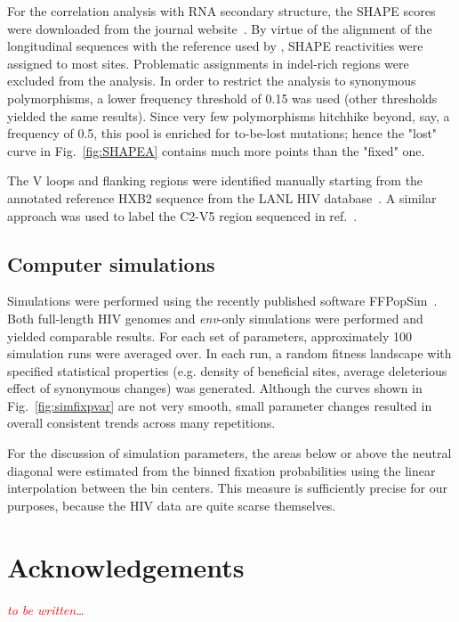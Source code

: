 \documentclass[rmp, twocolumn]{revtex4}
\newcommand{\env}{\textit{env}}
\newcommand{\comment}[1]{\textit{\textcolor{red}{#1}}}
\newcommand{\FIG}[1]{Fig.~\ref{fig:#1}}
\begin{document}
For the correlation analysis with RNA secondary structure, the SHAPE scores were
downloaded from the journal website~\citep{watts_architecture_2009}. By virtue
of the alignment of the longitudinal sequences with the reference used by
\citet{watts_architecture_2009}, SHAPE reactivities were assigned to most sites.
Problematic assignments in indel-rich regions were excluded from the analysis.
In order to restrict the analysis to synonymous polymorphisms, a lower frequency
threshold of 0.15 was used (other thresholds yielded the same results). Since
very few polymorphisms hitchhike beyond, say, a frequency of 0.5, this pool is
enriched for to-be-lost mutations; hence the "lost" curve in \FIG{SHAPEA}
contains much more points than the "fixed" one.

The V loops and flanking regions were identified manually starting from the
annotated reference HXB2 sequence from the LANL HIV database~\citep{LANL2012}. A
similar approach was used to label the C2-V5 region sequenced in
ref.~\citep{shankarappa_consistent_1999}.

\subsection{Computer simulations}
Simulations were performed using the recently published software
FFPopSim~\citep{zanini_ffpopsim:_2012}. Both full-length HIV genomes and
\env{}-only simulations were performed and yielded comparable results. For each
set of parameters, approximately 100 simulation runs were averaged over. In each
run, a random fitness landscape with specified statistical properties (e.g.
density of beneficial sites, average deleterious effect of synonymous changes) was generated.
Although the curves shown in \FIG{simfixpvar} are not very smooth, small
parameter changes resulted in overall consistent trends across many repetitions.

For the discussion of simulation parameters, the areas below or above the neutral
diagonal were estimated from the binned fixation probabilities using the linear
interpolation between the bin centers. This measure is sufficiently precise for
our purposes, because the HIV data are quite scarse themselves.

\section*{Acknowledgements}
\comment{to be written\dots}




\end{document}

